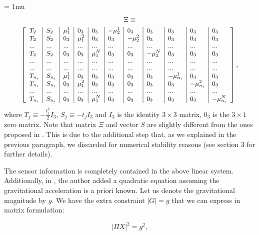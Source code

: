 \documentclass[letterpaper, 10 pt, journal, twoside]{IEEEtran}  %
\begin{document}
{
\arraycolsep=3pt %
\medmuskip = 1mu %
\begin{multline*}
  \Xi \equiv \\
      {
        \footnotesize
        \left[
          \begin{array}{l|l|l|l|l|l|l|l|l|l|l}
            T_2 & S_2 & \mu_1^1 & 0_3 & 0_3 & -\mu_2^1 & 0_3 & 0_3 & 0_3 & 0_3 & 0_3 \\
            T_2 & S_2 & 0_3 & \mu_1^2 & 0_3 & 0_3 & -\mu_2^2 & 0_3 & 0_3 & 0_3 & 0_3 \\
            ... & ... & ... & ... & ... & ... & ... & ... & ... & ... & ... \\
            T_2 & S_2 & 0_3 & 0_3 & \mu_1^N & 0_3 & 0_3 & -\mu_2^N & 0_3 & 0_3 & 0_3 \\
            ... & ... & ... & ... & ... & ... & ... & ... & ... & ... & ... \\
            ... & ... & ... & ... & ... & ... & ... & ... & ... & ... & ... \\
            T_{n_i} & S_{n_i} & \mu_1^1 & 0_3 & 0_3 & 0_3 & 0_3 & 0_3 & -\mu_{n_i}^1 & 0_3 & 0_3 \\
            T_{n_i} & S_{n_i} & 0_3 & \mu_1^2 & 0_3 & 0_3 & 0_3 & 0_3 & 0_3 & -\mu_{n_i}^2 & 0_3 \\
            ... & ... & ... & ... & ... & ... & ... & ... & ... & ... & ... \\
            T_{n_i} & S_{n_i} & 0_3 & 0_3 & \mu_1^N & 0_3 & 0_3 & 0_3 & 0_3 & 0_3 & -\mu_{n_i}^N
          \end{array}
          \right],
      }
\end{multline*}
}
\noindent where $T_j \equiv - \frac{t^2_j}{2} I_3$, $S_j \equiv -t_j I_3$ and $I_3$ is the identity $3\times 3$ matrix, $0_3$ is the $3\times 1$ zero matrix.
Note that matrix $\Xi$ and vector $S$ are slightly different from the ones proposed in \cite{Martinelli2014}.
This is due to the additional step that, as we explained in the previous paragraph, we discarded for numerical stability reasons (see \cite{Martinelli2014} section 3 for further details).

The sensor information is completely contained in the above linear system. Additionally, in \cite{Martinelli2014}, the author added a quadratic equation assuming the gravitational acceleration is a priori known.
Let us denote the gravitational magnitude by $g$.
We have the extra constraint $|G| = g$ that we can express in matrix formulation:

\begin{equation}
\label{eq:mat2}
| \Pi X | ^2 = g^2,
\end{equation}
\end{document}
